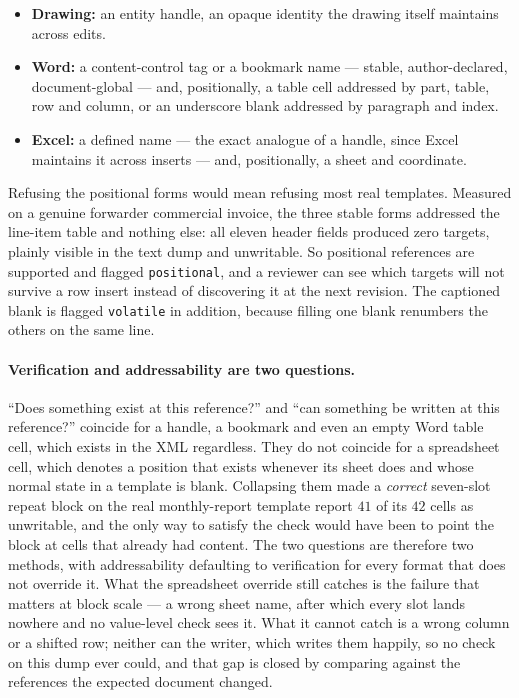 \begin{itemize}
  \item \textbf{Drawing:} an entity handle, an opaque identity the drawing itself maintains
    across edits.
  \item \textbf{Word:} a content-control tag or a bookmark name --- stable, author-declared,
    document-global --- and, positionally, a table cell addressed by part, table, row and
    column, or an underscore blank addressed by paragraph and index.
  \item \textbf{Excel:} a defined name --- the exact analogue of a handle, since Excel
    maintains it across inserts --- and, positionally, a sheet and coordinate.
\end{itemize}

Refusing the positional forms would mean refusing most real templates. Measured on a genuine
forwarder commercial invoice, the three stable forms addressed the line-item table and nothing
else: all eleven header fields produced zero targets, plainly visible in the text dump and
unwritable. So positional references are supported and flagged \texttt{positional}, and a
reviewer can see which targets will not survive a row insert instead of discovering it at the
next revision. The captioned blank is flagged \texttt{volatile} in addition, because filling
one blank renumbers the others on the same line.

\paragraph{Verification and addressability are two questions.}
``Does something exist at this reference?'' and ``can something be written at this reference?''
coincide for a handle, a bookmark and even an empty Word table cell, which exists in the XML
regardless. They do not coincide for a spreadsheet cell, which denotes a position that exists
whenever its sheet does and whose normal state in a template is blank. Collapsing them made a
\emph{correct} seven-slot repeat block on the real monthly-report template report $41$ of its
$42$ cells as unwritable, and the only way to satisfy the check would have been to point the
block at cells that already had content. The two questions are therefore two methods, with
addressability defaulting to verification for every format that does not override it. What the
spreadsheet override still catches is the failure that matters at block scale --- a wrong sheet
name, after which every slot lands nowhere and no value-level check sees it. What it cannot
catch is a wrong column or a shifted row; neither can the writer, which writes them happily, so
no check on this dump ever could, and that gap is closed by comparing against the references the
expected document changed.

